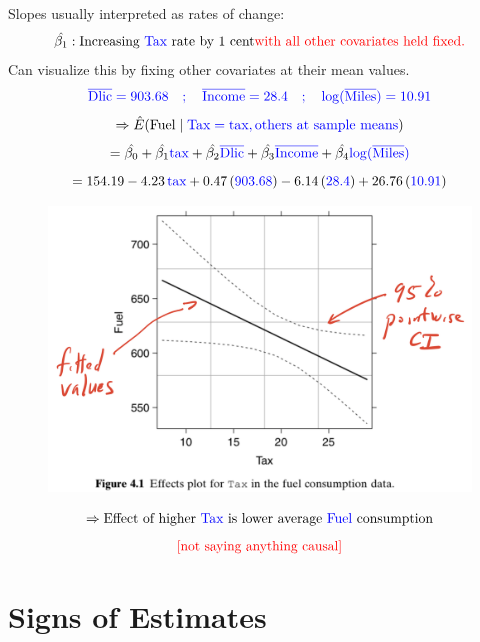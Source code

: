 \documentclass[14pt]{extarticle}
\begin{document}
\noindent
Slopes usually interpreted as rates of change: 
\[
\hat{\beta_1}: \text{Increasing } \textcolor{blue}{\text{Tax}} \text{ rate by 1 cent} 
\textcolor{red}{\text{with all other covariates held fixed.}}
\]
Can visualize this by fixing other covariates at their mean values. 
\[
\textcolor{blue}{\overline{\text{Dlic}} = 903.68 \quad ; \quad \overline{\text{Income}} = 28.4 \quad ; \quad \log(\overline{\text{Miles}}) = 10.91} 
\]
\[
\Rightarrow \hat{E}(\text{Fuel} \mid \textcolor{blue}{\text{Tax} = \text{tax}, \text{others at sample means}})
\]
\[
= \hat{\beta_0} + \hat{\beta_1} \textcolor{blue}{\text{tax}} + \hat{\beta_2} \textcolor{blue}{\overline{\text{Dlic}}} + \hat{\beta_3} \textcolor{blue}{\overline{\text{Income}}} + \hat{\beta_4} \textcolor{blue}{\log(\overline{\text{Miles}})}
\]
\[
= 154.19 - 4.23 \, \textcolor{blue}{\text{tax}} + 0.47 \, (\textcolor{blue}{903.68}) - 6.14 \, (\textcolor{blue}{28.4}) + 26.76 \, (\textcolor{blue}{10.91})
\]
\begin{figure}[H]
    \centering
    \includegraphics[width=1\textwidth]{fig1.png}
\end{figure}
\[
\Rightarrow \text{Effect of higher } \textcolor{blue}{\text{Tax}} \text{ is lower average } \textcolor{blue}{\text{Fuel}} \text{ consumption}
\]
\[
\textcolor{red}{\text{[not saying anything causal]}}
\]

\section*{Signs of Estimates}
\end{document}

